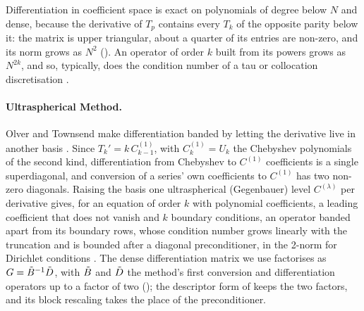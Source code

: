 Differentiation in coefficient space is exact on polynomials of degree below $N$ and dense, because the derivative of $T_p$ contains every $T_k$ of the opposite parity below it: the matrix is upper triangular, about a quarter of its entries are non-zero, and its norm grows as $N^2$ (). An operator of order $k$ built from its powers grows as $N^{2k}$, and so, typically, does the condition number of a tau or collocation discretisation \cite{olver2013,canuto2006spectral}.

\paragraph{Ultraspherical Method.}
\label{sec:bg-ultraspherical}

Olver and Townsend make differentiation banded by letting the derivative live in another basis \cite{olver2013}. Since $T_k'=k\,C^{(1)}_{k-1}$, with $C^{(1)}_k=U_k$ the Chebyshev polynomials of the second kind, differentiation from Chebyshev to $C^{(1)}$ coefficients is a single superdiagonal, and conversion of a series' own coefficients to $C^{(1)}$ has two non-zero diagonals. Raising the basis one ultraspherical (Gegenbauer) level $C^{(\lambda)}$ per derivative gives, for an equation of order $k$ with polynomial coefficients, a leading coefficient that does not vanish and $k$ boundary conditions, an operator banded apart from its boundary rows, whose condition number grows linearly with the truncation and is bounded after a diagonal preconditioner, in the 2-norm for Dirichlet conditions \cite{olver2013}. The dense differentiation matrix we use factorises as $G=\tilde{B}^{-1}\tilde{D}$, with $\tilde{B}$ and $\tilde{D}$ the method's first conversion and differentiation operators up to a factor of two (); the descriptor form of  keeps the two factors, and its block rescaling takes the place of the preconditioner.

